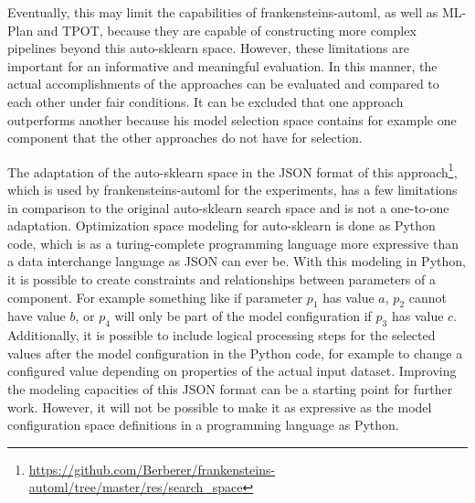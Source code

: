 Eventually, this may limit the capabilities of frankensteins-automl, as well as ML-Plan and TPOT, because they are capable of constructing more complex pipelines beyond this auto-sklearn space.
However, these limitations are important for an informative and meaningful evaluation.\newline
In this manner, the actual accomplishments of the approaches can be evaluated and compared to each other under fair conditions.
It can be excluded that one approach outperforms another because his model selection space contains for example one component that the other approaches do not have for selection.

The adaptation of the auto-sklearn space in the JSON format of this approach\footnote{\url{https://github.com/Berberer/frankensteins-automl/tree/master/res/search_space}}, which is used by frankensteins-automl for the experiments, has a few limitations in comparison to the original auto-sklearn search space and is not a one-to-one adaptation.
Optimization space modeling for auto-sklearn is done as Python code, which is as a turing-complete programming language more expressive than a data interchange language as JSON can ever be.
With this modeling in Python, it is possible to create constraints and relationships between parameters of a component.
For example something like if parameter $p_1$ has value $a$, $p_2$ cannot have value $b$, or $p_4$ will only be part of the model configuration if $p_3$ has value $c$.\newline
Additionally, it is possible to include logical processing steps for the selected values after the model configuration in the Python code, for example to change a configured value depending on properties of the actual input dataset.\newline
Improving the modeling capacities of this JSON format can be a starting point for further work.
However, it will not be possible to make it as expressive as the model configuration space definitions in a programming language as Python.

